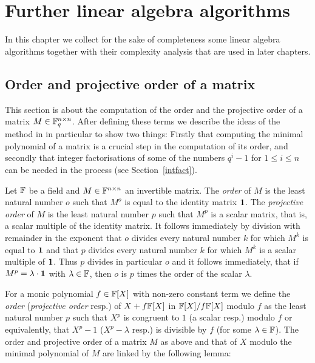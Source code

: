 
\chapter{Further linear algebra algorithms}
\label{chap:linalg}

In this chapter we collect for the sake of completeness some
linear algebra algorithms together with their complexity analysis
that are used in later chapters. 

\section{Order and projective order of a matrix}
\label{sec:orders}

This section is about the computation of the order and the projective
order of a matrix $M \in \mathbb{F}_q^{n \times n}$. After defining these 
terms we describe the 
ideas of the method in \cite{CellLeedOrder} in particular to show
two things: Firstly that computing the minimal polynomial of a matrix
is a crucial step in the computation of its order, and secondly that
integer factorisations of some of the numbers $q^i-1$ for $1 \le i \le n$ 
can be needed in the process (see Section~\ref{intfact}).

\begin{DefProp}
Let $\mathbb{F}$ be a field and $M \in \mathbb{F}^{n \times
n}$ an invertible matrix. The \emph{order} of $M$ is the least natural
number $o$ such that $M^o$ is equal to the identity matrix\/ $\mathbf{1}$.
The \emph{projective order} of $M$ is the least natural number $p$
such that $M^p$ is a scalar matrix, that is, a scalar multiple of the
identity matrix. It follows immediately by division with remainder in
the exponent that $o$ divides every natural number $k$ for which 
$M^k$ is equal to\/ $\mathbf{1}$ and that $p$ divides every natural number $k$
for which $M^k$ is a scalar multiple of\/ $\mathbf{1}$. Thus $p$ divides in
particular $o$ and it follows immediately, that if $M^p = \lambda \cdot
\mathbf{1}$ with $\lambda \in \mathbb{F}$, then $o$ is $p$ times the order of the
scalar $\lambda$. \proofend
\end{DefProp}

For a monic polynomial $f \in \mathbb{F}[X]$ with non-zero constant term
we define the \emph{order} (\emph{projective order} resp.) of 
$X + f\mathbb{F}[X]$ in $\mathbb{F}[X]/f\mathbb{F}[X]$ modulo $f$ as the least natural 
number $p$ such that $X^p$ is congruent 
to $1$ (a scalar resp.) modulo $f$ or equivalently, that $X^p-1$ 
($X^p-\lambda$ resp.) is
divisible by $f$ (for some $\lambda \in \mathbb{F}$). 
The order and projective order
of a matrix $M$ as above and that of $X$ modulo the minimal polynomial 
of $M$ are linked by the following lemma:

